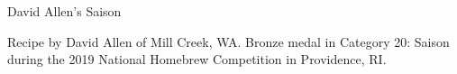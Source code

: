 \begin{recipe}{David Allen's Saison} %

\begin{aboutblock}
Recipe by David Allen of Mill Creek, WA. Bronze medal in Category 20: Saison
during the 2019 National Homebrew Competition in Providence, RI. \sourceaha
\end{aboutblock}


\begin{methodandtiming}
 
\begin{mashsteps}
\end{mashsteps}

\begin{fermentationsteps}
\end{fermentationsteps}

\end{methodandtiming}

\recipebreak

\begin{ingredientsblock}

\begin{malts}
\end{malts}

\begin{hops}
\end{hops}

\begin{yeastsx}
\end{yeastsx}

\end{ingredientsblock}

\end{recipe}

